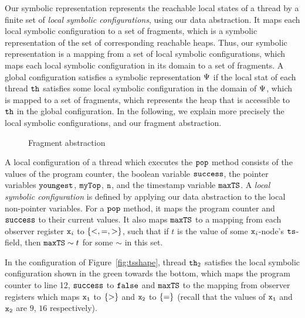 Our symbolic representation represents the reachable local states of a thread by
a finite set of {\em local symbolic configurations}, using our
data abstraction.
It maps each local symbolic configuration to a set of fragments, which
is a symbolic representation of the set of corresponding reachable heaps.
Thus, our symbolic representation is a mapping from a set of local symbolic
configurations, which maps each local symbolic configuration in its domain
to a set of fragments.
A global configuration satisfies a symbolic representation $\Psi$
if the local stat of each thread ${\tt th}$ satisfies some local symbolic
configuration in the domain of $\Psi$, which is mapped to a set
of fragments, which represents the heap that is accessible to ${\tt th}$ in
the global configuration. In the following, we explain more precisely the
local symbolic configurations, and our fragment abstraction.

\begin{figure}
	
\caption{Fragment abstraction}
\label{fig:tsviewshape}
\end{figure} 
A local configuration of a thread which executes the ${\tt pop}$ method consists
of the values of the program counter, the boolean variable ${\tt success}$, the
pointer variables ${\tt youngest}$, ${\tt myTop}$, ${\tt n}$,
and the timestamp variable ${\tt maxTS}$.
A {\em local symbolic configuration} is defined by applying our data abstraction
to the local non-pointer variables.  For a ${\tt pop}$ method, it maps
the program counter and ${\tt success}$ to their current values. It also maps
${\tt maxTS}$ to a mapping from each observer register $\mathtt{x}_i$
to $\left\{<,=,>\right\}$, such that if $t$ is the value of some $\mathtt{x}_i$-node's
$\tt ts$-field, then ${\tt maxTS} \sim t$ for some $\sim$ in this set.

In the configuration of Figure~\ref{fig:tsshape}, thread ${\tt th}_2$
satisfies the local symbolic configuration shown in the green towards the
bottom, 
which maps the program counter to line 12, ${\tt success}$ to ${\tt false}$ and ${\tt maxTS}$ to the mapping from observer registers which maps
$\tt x_1$ to $\left\{>\right\}$ and $\tt x_2$ to $\left\{=\right\}$
(recall that the values of $\tt x_1$ and $\tt x_2$ are $9$, $16$ respectively).



